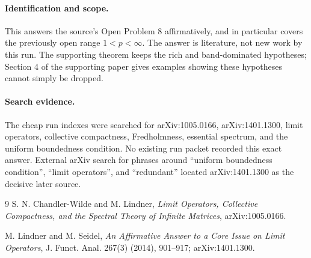\documentclass[11pt]{article}
\begin{document}
\paragraph{Identification and scope.}
This answers the source's Open Problem 8 affirmatively, and in particular
covers the previously open range \(1<p<\infty\).  The answer is literature,
not new work by this run.  The supporting theorem keeps the rich and
band-dominated hypotheses; Section 4 of the supporting paper gives examples
showing these hypotheses cannot simply be dropped.

\paragraph{Search evidence.}
The cheap run indexes were searched for arXiv:1005.0166, arXiv:1401.1300,
limit operators, collective compactness, Fredholmness, essential spectrum,
and the uniform boundedness condition.  No existing run packet recorded this
exact answer.  External arXiv search for phrases around ``uniform boundedness
condition'', ``limit operators'', and ``redundant'' located arXiv:1401.1300 as
the decisive later source.

\begin{thebibliography}{9}
S. N. Chandler-Wilde and M. Lindner,
\emph{Limit Operators, Collective Compactness, and the Spectral Theory of
Infinite Matrices},
arXiv:1005.0166.

M. Lindner and M. Seidel,
\emph{An Affirmative Answer to a Core Issue on Limit Operators},
J. Funct. Anal. 267(3) (2014), 901--917; arXiv:1401.1300.
\end{thebibliography}
\end{document}
